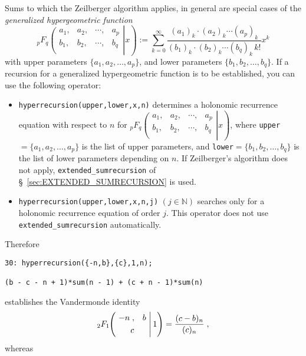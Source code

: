 Sums to which the Zeilberger algorithm applies, in general are
special cases of the {\sl generalized hypergeometric function}
\[
_{p}F_{q}\left.\left(\begin{array}{cccc}
a_{1},&a_{2},&\cdots,&a_{p}\\
b_{1},&b_{2},&\cdots,&b_{q}\\
            \end{array}\right| x\right)
:=
\sum_{k=0}^\infty \frac
{(a_{1})_{k}\cdot(a_{2})_{k}\cdots(a_{p})_{k}}
{(b_{1})_{k}\cdot(b_{2})_{k}\cdots(b_{q})_{k}\,k!}x^{k}
\label{eq:coefficientformula}
\]
with upper parameters $\{a_{1}, a_{2}, \ldots, a_{p}\}$, and lower
parameters $\{b_{1}, b_{2}, \ldots, b_{q}\}$. If a recursion for a
generalized hypergeometric function is to be established, you can use
the following \REDUCE{} operator:
\begin{itemize}
\item
{\tt hyperrecursion(upper,lower,x,n)} determines a holonomic recurrence 
equation with respect to $n$ for 
$_{p}F_{q}\left.\left(\begin{array}{cccc}
a_{1},&a_{2},&\cdots,&a_{p}\\
b_{1},&b_{2},&\cdots,&b_{q}\\
            \end{array}\right| x\right)
$, where {\tt upper}$=\{a_{1}, a_{2}, \ldots, a_{p}\}$
is the list of upper parameters, and 
{\tt lower}$=\{b_{1}, b_{2}, \ldots, b_{q}\}$
is the list of lower parameters depending on $n$. If Zeilberger's algorithm
does not apply, {\tt extended\_sumrecursion} 
of \S~\ref{sec:EXTENDED_SUMRECURSION} is used.
\item
{\tt hyperrecursion(upper,lower,x,n,j)} $(j\in\mathbb{N})$
searches only for a holonomic recurrence equation of order $j$. This
operator does not use {\tt extended\_sumrecursion} automatically.
\end{itemize}
Therefore

{\small
\begin{verbatim}
30: hyperrecursion({-n,b},{c},1,n);

(b - c - n + 1)*sum(n - 1) + (c + n - 1)*sum(n)
\end{verbatim}
}\noindent
establishes the Vandermonde identity
\[
_2 F_1\left.
\!\!
\left(
\!\!\!\!
\begin{array}{c}
\multicolumn{1}{c}{\begin{array}{cc} -n\;, & b \end{array}}\\[1mm]
\multicolumn{1}{c}{ c}
            \end{array}
\!\!\!\!
\right| 1\right)
=\frac{(c-b)_n}{(c)_n}
\;,
\]
whereas

